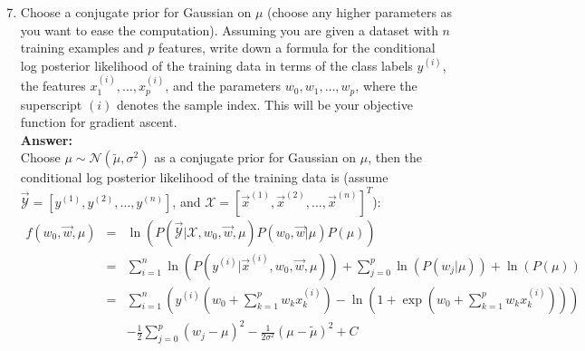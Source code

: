 \documentclass{article}
\begin{document}
\begin{enumerate}
	\setcounter{enumi}{6}
	\item Choose a conjugate prior for Gaussian on $\mu$ (choose any higher parameters as you want to ease the computation). Assuming you are given a dataset with $n$ training examples and $p$ features, write down a formula for the conditional log posterior likelihood of the training data in terms of the class labels $y^{(i)}$, the features $x_1^{(i)},\dots,x_p^{(i)}$, and the parameters $w_0,w_1,\dots,w_p$, where the superscript $(i)$ denotes the sample index. This will be your objective function for gradient ascent.
	\\\textbf{Answer:}\\
	Choose $\mu \sim \mathcal{N}(\tilde{\mu},\sigma^2)$ as a conjugate prior for Gaussian on $\mu$, then the conditional log posterior likelihood of the training data is (assume $\vec{\mathcal{Y}}=[y^{(1)},y^{(2)},\dots,y^{(n)}]$, and $\mathcal{X}=[\vec{x}^{(1)},\vec{x}^{(2)},\dots,\vec{x}^{(n)}]^T$):
	\begin{equation}
	\nonumber
	\begin{array}{rcl}
	f(w_0, \vec{w},\mu) & = & \ln(P(\vec{\mathcal{Y}}|\mathcal{X},w_0,\vec{w},\mu)P(w_0,\vec{w}|\mu)P(\mu)) \\
						& = & \sum_{i=1}^{n}\ln(P(y^{(i)}|\vec{x}^{(i)},w_0,\vec{w},\mu))+\sum_{j=0}^{p}\ln(P(w_j|\mu))+\ln(P(\mu)) \\
						& = & \sum_{i=1}^{n}(y^{(i)}(w_0+\sum_{k=1}^{p}w_kx_k^{(i)})-\ln(1+\exp(w_0+\sum_{k=1}^{p}w_kx_k^{(i)})))\\
						&   & -\frac{1}{2}\sum_{j=0}^{p}{(w_j-\mu)^2} - \frac{1}{2\sigma^2}(\mu-\tilde{\mu})^2 + C
	\end{array}
	\end{equation}
	

\end{enumerate}
\end{document}
